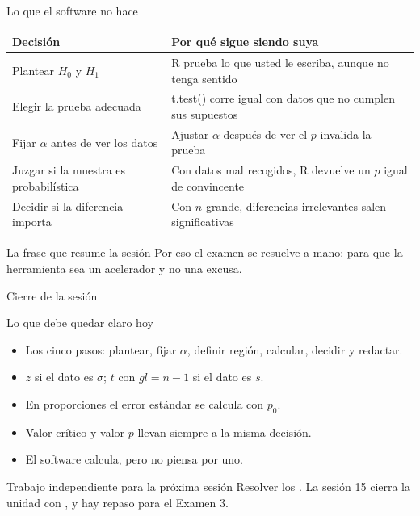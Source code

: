 \documentclass[aspectratio=169,10pt]{beamer}
\newcommand{\fx}[1]{{\ttfamily\color{uniAzul}#1}}
\begin{document}
\begin{frame}{Lo que el software no hace}
  \scriptsize
  \begin{center}
  \begin{tabular}{@{}p{4.6cm}p{7.2cm}@{}}
    \toprule
    \textbf{Decisión} & \textbf{Por qué sigue siendo suya} \\
    \midrule
    Plantear $H_0$ y $H_1$ &
      R prueba lo que usted le escriba, aunque no tenga sentido \\
    \addlinespace
    Elegir la prueba adecuada &
      \fx{t.test()} corre igual con datos que no cumplen sus supuestos \\
    \addlinespace
    Fijar $\alpha$ antes de ver los datos &
      Ajustar $\alpha$ después de ver el $p$ invalida la prueba \\
    \addlinespace
    Juzgar si la muestra es probabilística &
      Con datos mal recogidos, R devuelve un $p$ igual de convincente \\
    \addlinespace
    Decidir si la diferencia importa &
      Con $n$ grande, diferencias irrelevantes salen significativas \\
    \bottomrule
  \end{tabular}
  \end{center}

  \vspace{0.05cm}
  \begin{alertblock}{La frase que resume la sesión}
    \tiny
     Por eso el examen se resuelve a mano: para que la herramienta sea
    un acelerador y no una excusa.
  \end{alertblock}
\end{frame}

\begin{frame}{Cierre de la sesión}
  \begin{block}{Lo que debe quedar claro hoy}
    \begin{itemize}
      \item Los cinco pasos: plantear, fijar $\alpha$, definir región, calcular,
            decidir y redactar.
      \item $z$ si el dato es $\sigma$; $t$ con $gl=n-1$ si el dato es $s$.
      \item En proporciones el error estándar se calcula con $p_0$.
      \item Valor crítico y valor $p$ llevan siempre a la misma decisión.
      \item El software calcula, pero no piensa por uno.
    \end{itemize}
  \end{block}

  \vspace{0.2cm}
  \begin{alertblock}{Trabajo independiente para la próxima sesión}
    \footnotesize
    Resolver los . La sesión 15
    cierra la unidad con , y hay repaso
    para el Examen 3.
  \end{alertblock}
\end{frame}
\end{document}
